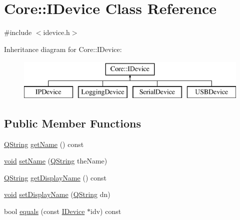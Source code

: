 \hypertarget{class_core_1_1_i_device}{\section{\-Core\-:\-:\-I\-Device \-Class \-Reference}
\label{class_core_1_1_i_device}
}


{\ttfamily \#include $<$idevice.\-h$>$}

\-Inheritance diagram for \-Core\-:\-:\-I\-Device\-:\begin{figure}[H]
\begin{center}
\leavevmode
\includegraphics[height=2.000000cm]{class_core_1_1_i_device}
\end{center}
\end{figure}
\subsection*{\-Public \-Member \-Functions}
\begin{DoxyCompactItemize}
\item 
\hyperlink{group___u_a_v_objects_plugin_gab9d252f49c333c94a72f97ce3105a32d}{\-Q\-String} \hyperlink{group___core_plugin_ga815e1b550a4ffe8dbb76636026146145}{get\-Name} () const 
\item 
\hyperlink{group___u_a_v_objects_plugin_ga444cf2ff3f0ecbe028adce838d373f5c}{void} \hyperlink{group___core_plugin_ga10075657372ad8ae53f7b18c697b9498}{set\-Name} (\hyperlink{group___u_a_v_objects_plugin_gab9d252f49c333c94a72f97ce3105a32d}{\-Q\-String} the\-Name)
\item 
\hyperlink{group___u_a_v_objects_plugin_gab9d252f49c333c94a72f97ce3105a32d}{\-Q\-String} \hyperlink{group___core_plugin_ga8504228d03605f9d90209f4117f4a987}{get\-Display\-Name} () const 
\item 
\hyperlink{group___u_a_v_objects_plugin_ga444cf2ff3f0ecbe028adce838d373f5c}{void} \hyperlink{group___core_plugin_ga6dc9f15ee9f6cf8ed6e60d0aa0ff15e8}{set\-Display\-Name} (\hyperlink{group___u_a_v_objects_plugin_gab9d252f49c333c94a72f97ce3105a32d}{\-Q\-String} dn)
\item 
bool \hyperlink{group___core_plugin_gac5c0277c3690da70fcb203767846a1ed}{equals} (const \hyperlink{class_core_1_1_i_device}{\-I\-Device} $\ast$idv) const 
\end{DoxyCompactItemize}


